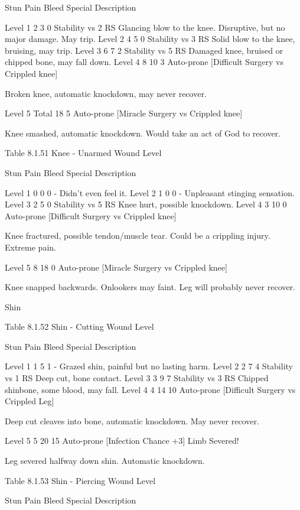 \documentclass[oneside,11pt,english]{book}
\begin{document}
Stun Pain Bleed Special Description 

Level 1 2 3 0 Stability vs 2 RS Glancing blow to the knee. Disruptive, but no 
major damage. May trip. 
Level 2 4 5 0 Stability vs 3 RS Solid blow to the knee, bruising, may trip. 
Level 3 6 7 2 Stability vs 5 RS Damaged knee, bruised or chipped bone, may fall 
down. 
Level 4 8 10 3 Auto-prone 
[Difficult Surgery vs 
Crippled knee] 

Broken knee, automatic knockdown, may never 
recover. 

Level 5 Total 18 5 Auto-prone 
[Miracle Surgery vs 
Crippled knee] 

Knee smashed, automatic knockdown. Would take 
an act of God to recover. 

 
Table 8.1.51 Knee - Unarmed 
Wound 
Level 

Stun Pain Bleed Special Description 

Level 1 0 0 0 - Didn’t even feel it. 
Level 2 1 0 0 - Unpleasant stinging sensation. 
Level 3 2 5 0 Stability vs 5 RS Knee hurt, possible knockdown. 
Level 4 3 10 0 Auto-prone 
[Difficult Surgery vs 
Crippled knee] 

Knee fractured, possible tendon/muscle tear. Could 
be a crippling injury. Extreme pain. 

Level 5 8 18 0 Auto-prone 
[Miracle Surgery vs 
Crippled knee] 

Knee snapped backwards. Onlookers may faint. Leg 
will probably never recover. 

 

 


Shin 

 

Table 8.1.52 Shin - Cutting 
Wound 
Level 

Stun Pain Bleed Special Description 

Level 1 1 5 1 - Grazed shin, painful but no lasting harm. 
Level 2 2 7 4 Stability vs 1 RS Deep cut, bone contact. 
Level 3 3 9 7 Stability vs 3 RS Chipped shinbone, some blood, may fall. 
Level 4 4 14 10 Auto-prone 
[Difficult Surgery vs 
Crippled Leg] 

Deep cut cleaves into bone, automatic 
knockdown. May never recover. 

Level 5 5 20 15 Auto-prone 
[Infection Chance +3] 
Limb Severed! 

Leg severed halfway down shin. Automatic 
knockdown. 

 
Table 8.1.53 Shin - Piercing 
Wound 
Level 

Stun Pain Bleed Special Description 
\end{document}
